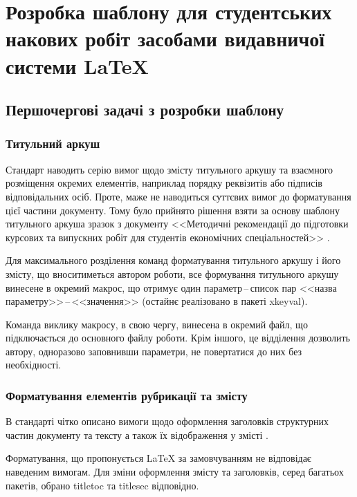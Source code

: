 \chapter{Розробка шаблону для студентських накових робіт засобами видавничої системи \LaTeX{}} 
\label{chap:second}

\section{Першочергові задачі з розробки шаблону}

\subsection{Титульний аркуш}

Стандарт наводить серію вимог \cite[с.~15]{DSTU20153008} щодо змісту титульного аркушу та взаємного розміщення окремих елементів, наприклад порядку реквізитів або підписів відповідальних осіб. Проте, маже не наводиться суттєвих вимог до форматування цієї частини документу. Тому було прийнято рішення взяти за основу шаблону титульного аркуша зразок з документу <<Методичні рекомендації до підготовки курсових та випускних робіт для студентів економічних спеціальностей>> \cite[c.~39]{doc:methodika:1}.

Для максимального розділення команд форматування титульного аркушу і його змісту, що вноситиметься автором роботи, все формування титульного аркушу винесене в окремий макрос, що отримує один параметр\,--\,список пар <<назва параметру>>\,--\,<<значення>> (остайнє реалізовано в пакеті xkeyval).

Команда виклику макросу, в свою чергу, винесена в окремий файл, що підключається до основного файлу роботи. Крім іншого, це відділення дозволить автору, одноразово заповнивши параметри, не повертатися до них без необхідності.

\subsection{Форматування елементів рубрикації та змісту}
\label{dev:toc}

В стандарті чітко описано вимоги щодо оформлення заголовків структурних частин документу та тексту а також їх відображення у змісті \cite[с.~4]{DSTU20153008}\cite[с.~8]{DSTU20153008}.

Форматування, що пропонується \LaTeX{} за замовчуванням не відповідає наведеним вимогам. Для зміни оформлення змісту та заголовків, серед багатьох пакетів, обрано titletoc та titlesec відповідно.

